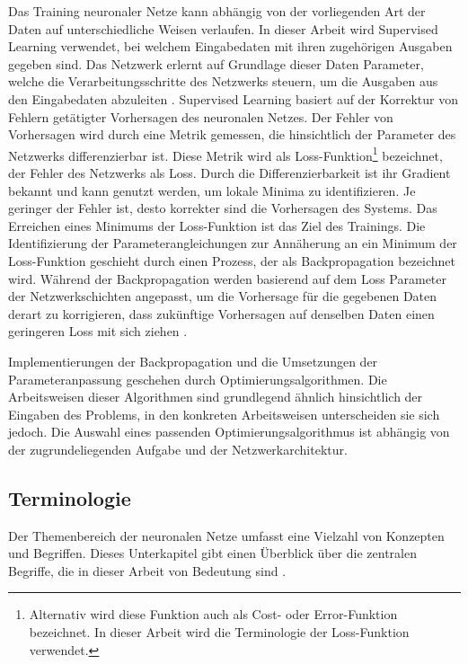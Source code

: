 Das Training neuronaler Netze kann abhängig von der vorliegenden Art der Daten auf unterschiedliche Weisen verlaufen. In dieser Arbeit wird Supervised Learning verwendet, bei welchem Eingabedaten mit ihren zugehörigen Ausgaben gegeben sind. Das Netzwerk erlernt auf Grundlage dieser Daten Parameter, welche die Verarbeitungsschritte des Netzwerks steuern, um die Ausgaben aus den Eingabedaten abzuleiten \cite{nn_terminology}. Supervised Learning basiert auf der Korrektur von Fehlern getätigter Vorhersagen des neuronalen Netzes. Der Fehler von Vorhersagen wird durch eine Metrik gemessen, die hinsichtlich der Parameter des Netzwerks differenzierbar ist. Diese Metrik wird als Loss-Funktion\footnote{Alternativ wird diese Funktion auch als Cost- oder Error-Funktion bezeichnet. In dieser Arbeit wird die Terminologie der Loss-Funktion verwendet.} bezeichnet, der Fehler des Netzwerks als Loss. Durch die Differenzierbarkeit ist ihr Gradient bekannt und kann genutzt werden, um lokale Minima zu identifizieren. Je geringer der Fehler ist, desto korrekter sind die Vorhersagen des Systems. Das Erreichen eines Minimums der Loss-Funktion ist das Ziel des Trainings. Die Identifizierung der Parameterangleichungen zur Annäherung an ein Minimum der Loss-Funktion geschieht durch einen Prozess, der als Backpropagation bezeichnet wird. Während der Backpropagation werden basierend auf dem Loss Parameter der Netzwerkschichten angepasst, um die Vorhersage für die gegebenen Daten derart zu korrigieren, dass zukünftige Vorhersagen auf denselben Daten einen geringeren Loss mit sich ziehen \cite{cv_general}.

Implementierungen der Backpropagation und die Umsetzungen der Parameteranpassung geschehen durch Optimierungsalgorithmen. Die Arbeitsweisen dieser Algorithmen sind grundlegend ähnlich hinsichtlich der Eingaben des Problems, in den konkreten Arbeitsweisen unterscheiden sie sich jedoch. Die Auswahl eines passenden Optimierungsalgorithmus ist abhängig von der zugrundeliegenden Aufgabe und der Netzwerkarchitektur.


\subsection{Terminologie}
\label{sec:nn_terminologie}

Der Themenbereich der neuronalen Netze umfasst eine Vielzahl von Konzepten und Begriffen. Dieses Unterkapitel gibt einen Überblick über die zentralen Begriffe, die in dieser Arbeit von Bedeutung sind \cite{nn_terminology}.

